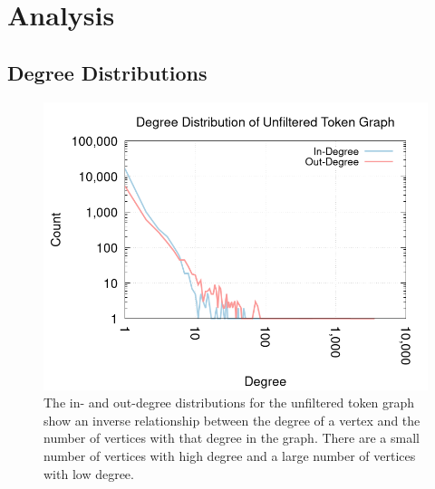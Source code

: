 \section{Analysis}\label{sec:analysis}

\subsection{Degree Distributions}\label{sec:analysis-degree-distribution}

\begin{figure}
  \centerline{\includegraphics[width=\columnwidth]{img/degree-distributions/unfiltered-token-graph-degrees.png}}
  \caption{The in- and out-degree distributions for the unfiltered
    token graph show an inverse relationship between the degree of a
    vertex and the number of vertices with that degree in the graph.
    There are a small number of vertices with high degree and a large
    number of vertices with low
    degree.}\label{fig:unfiltered-token-graph-degrees}
\end{figure}

